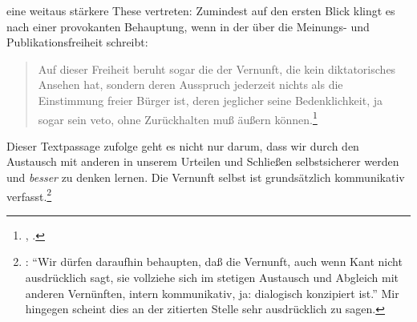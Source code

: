 eine weitaus stärkere These vertreten:
Zumindest auf den ersten Blick klingt es nach einer provokanten Behauptung, wenn
 in der  über die Meinungs- und
Publikationsfreiheit schreibt:
\begin{quote}
  Auf dieser Freiheit beruht sogar die  der Vernunft, die kein
  diktatorisches Ansehen hat, sondern deren Ausspruch jederzeit nichts als die
  Einstimmung freier Bürger ist, deren jeglicher seine Bedenklichkeit, ja sogar
  sein veto, ohne Zurückhalten muß äußern
  können.\footnote{\cite[][B~766\,f.,]{Kant:KritikderreinenVernunft2003}
  \cite[III: 484.10--14]{Kant:GesammelteWerke1900ff.}, \myherv .}
\end{quote}
Dieser Textpassage zufolge geht es nicht nur darum, dass wir durch den Austausch
mit anderen in unserem Urteilen und Schließen selbstsicherer werden und \emph{besser} zu denken
lernen. Die Vernunft selbst ist grundsätzlich kommunikativ
verfasst.\footnote{\cite[Vgl.][120]{Recki:enquoteAnderStelle[je]desanderendenken2006}:
\enquote{Wir dürfen daraufhin behaupten, daß die Vernunft, auch wenn Kant nicht
ausdrücklich sagt, sie vollziehe sich im stetigen Austausch und Abgleich mit
anderen Vernünften, intern kommunikativ, ja: dialogisch konzipiert ist.} Mir
hingegen scheint  dies an der zitierten Stelle sehr ausdrücklich zu
sagen.}

